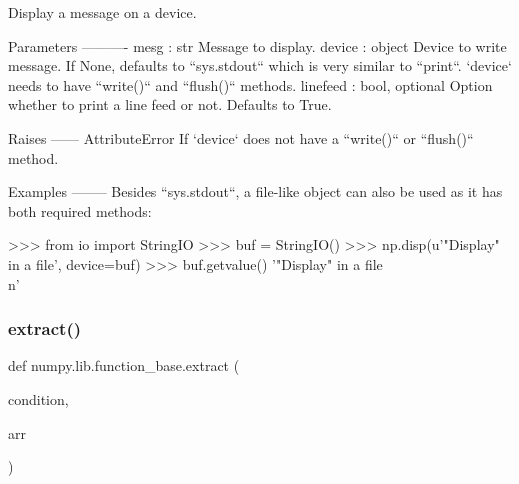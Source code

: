\begin{DoxyVerb}Display a message on a device.

Parameters
----------
mesg : str
    Message to display.
device : object
    Device to write message. If None, defaults to ``sys.stdout`` which is
    very similar to ``print``. `device` needs to have ``write()`` and
    ``flush()`` methods.
linefeed : bool, optional
    Option whether to print a line feed or not. Defaults to True.

Raises
------
AttributeError
    If `device` does not have a ``write()`` or ``flush()`` method.

Examples
--------
Besides ``sys.stdout``, a file-like object can also be used as it has
both required methods:

>>> from io import StringIO
>>> buf = StringIO()
>>> np.disp(u'"Display" in a file', device=buf)
>>> buf.getvalue()
'"Display" in a file\\n'\end{DoxyVerb}
 \mbox{\label{namespacenumpy_1_1lib_1_1function__base_a101a3499fc1bf6b3358d526f1ee44660}} 
\subsubsection{\texorpdfstring{extract()}{extract()}}
{\footnotesize\ttfamily def numpy.\+lib.\+function\+\_\+base.\+extract (\begin{DoxyParamCaption}\item[{}]{condition,  }\item[{}]{arr }\end{DoxyParamCaption})}


